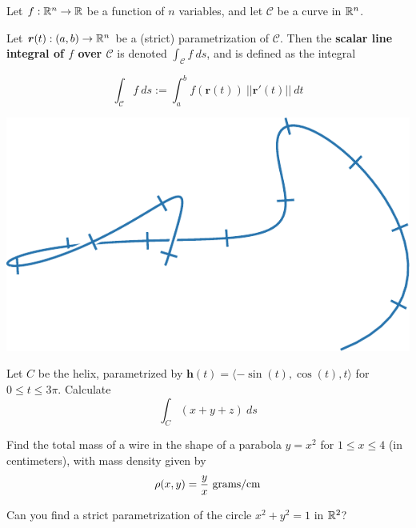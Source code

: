     \begin{definition}
    Let $f : \mathbb{R}^n \to \mathbb{R}$ be a function of $n$ variables, and let $\mathcal{C}$ be a curve in $\mathbb{R}^n$.

    Let $\bm{r}(t) : (a,b) \to \mathbb{R}^n$ be a (strict) parametrization of $\mathcal{C}$.  Then the \textbf{scalar line integral  of $f$ over $\mathcal{C}$} is denoted $\int_\mathcal{C} f \ ds$, and is defined as the integral

    $$\int_\mathcal{C} f \ ds := \int_a^b f(\bm{r}(t)) \ ||\bm{r}'(t)|| \ dt$$
    
    \end{definition}

    \begin{center}
        \includegraphics{chapters/5-IntegrationManifolds/figures/figures-partitioncurve.pdf}
    \end{center}

    \begin{example}
        Let $C$ be the helix, parametrized by $\bm{h}(t) = \langle -\sin(t), \cos(t), t \rangle$ for $0 \leq t \leq 3\pi$.  Calculate
    $$\int_C (x + y + z) \ ds$$
    \end{example}

    \begin{example}
     Find the total mass of a wire in the shape of a parabola $y = x^2$ for $1 \leq x \leq 4$ (in centimeters), with mass density given by $$\rho(x,y) = \frac{y}{x} \  \textnormal{grams/cm}$$   
    \end{example}

    \begin{motivating}
        Can you find a strict parametrization of the circle $x^2+y^2=1$ in $\mathbb{R}^2$?
    \end{motivating}

